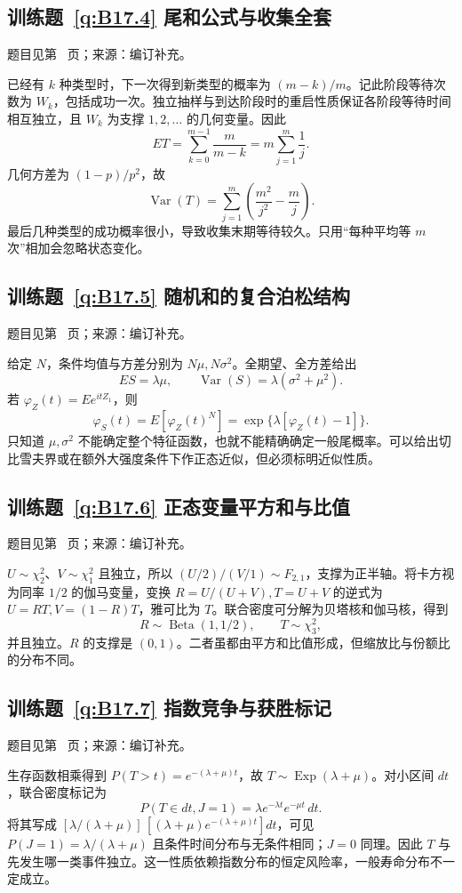 \subsection*{训练题~\ref{q:B17.4} 尾和公式与收集全套}\label{a:B17.4}{\small 题目见第~\pageref{q:B17.4} 页；来源：编订补充。}
\begin{solve}已经有 $k$ 种类型时，下一次得到新类型的概率为 $(m-k)/m$。记此阶段等待次数为 $W_k$，包括成功一次。独立抽样与到达阶段时的重启性质保证各阶段等待时间相互独立，且 $W_k$ 为支撑 $1,2,\ldots$ 的几何变量。因此\[ET=\sum_{k=0}^{m-1}\frac{m}{m-k}=m\sum_{j=1}^m\frac1j.\]几何方差为 $(1-p)/p^2$，故\[\operatorname{Var}(T)=\sum_{j=1}^m\left(\frac{m^2}{j^2}-\frac mj\right).\]最后几种类型的成功概率很小，导致收集末期等待较久。只用“每种平均等 $m$ 次”相加会忽略状态变化。\end{solve}

\subsection*{训练题~\ref{q:B17.5} 随机和的复合泊松结构}\label{a:B17.5}{\small 题目见第~\pageref{q:B17.5} 页；来源：编订补充。}
\begin{solve}给定 $N$，条件均值与方差分别为 $N\mu,N\sigma^2$。全期望、全方差给出\[ES=\lambda\mu,\qquad\operatorname{Var}(S)=\lambda(\sigma^2+\mu^2).\]若 $\varphi_Z(t)=Ee^{itZ_1}$，则\[\varphi_S(t)=E[\varphi_Z(t)^N]=\exp\{\lambda[\varphi_Z(t)-1]\}.\]只知道 $\mu,\sigma^2$ 不能确定整个特征函数，也就不能精确确定一般尾概率。可以给出切比雪夫界或在额外大强度条件下作正态近似，但必须标明近似性质。\end{solve}

\subsection*{训练题~\ref{q:B17.6} 正态变量平方和与比值}\label{a:B17.6}{\small 题目见第~\pageref{q:B17.6} 页；来源：编订补充。}
\begin{solve}$U\sim\chi^2_2$、$V\sim\chi^2_1$ 且独立，所以 $(U/2)/(V/1)\sim F_{2,1}$，支撑为正半轴。将卡方视为同率 $1/2$ 的伽马变量，变换 $R=U/(U+V),T=U+V$ 的逆式为 $U=RT,V=(1-R)T$，雅可比为 $T$。联合密度可分解为贝塔核和伽马核，得到\[R\sim\operatorname{Beta}(1,1/2),\qquad T\sim\chi^2_3,\]并且独立。$R$ 的支撑是 $(0,1)$。二者虽都由平方和比值形成，但缩放比与份额比的分布不同。\end{solve}

\subsection*{训练题~\ref{q:B17.7} 指数竞争与获胜标记}\label{a:B17.7}{\small 题目见第~\pageref{q:B17.7} 页；来源：编订补充。}
\begin{solve}生存函数相乘得到 $P(T>t)=e^{-(\lambda+\mu)t}$，故 $T\sim\operatorname{Exp}(\lambda+\mu)$。对小区间 $dt$，联合密度标记为\[P(T\in dt,J=1)=\lambda e^{-\lambda t}e^{-\mu t}\,dt.\]将其写成 $[\lambda/(\lambda+\mu)]\,[(\lambda+\mu)e^{-(\lambda+\mu)t}]dt$，可见 $P(J=1)=\lambda/(\lambda+\mu)$ 且条件时间分布与无条件相同；$J=0$ 同理。因此 $T$ 与先发生哪一类事件独立。这一性质依赖指数分布的恒定风险率，一般寿命分布不一定成立。\end{solve}

